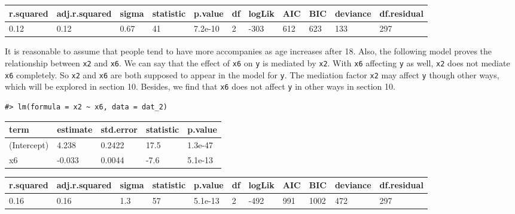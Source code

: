 \documentclass[main.tex]{subfiles}
\begin{document}
\begin{table}[H]
\centering
\begin{tabular}{lllllllllll}
\toprule
r.squared & adj.r.squared & sigma & statistic & p.value & df & logLik & AIC & BIC & deviance & df.residual\\
\midrule
0.12 & 0.12 & 0.67 & 41 & 7.2e-10 & 2 & -303 & 612 & 623 & 133 & 297\\
\bottomrule
\end{tabular}
\end{table}

It is reasonable to assume that people tend to have more accompanies as
age increases after 18. Also, the following model proves the
relationship between \texttt{x2} and \texttt{x6}. We can say that the
effect of \texttt{x6} on \texttt{y} is mediated by \texttt{x2}. With
\texttt{x6} affecting \texttt{y} as well, \texttt{x2} does not mediate
\texttt{x6} completely. So \texttt{x2} and \texttt{x6} are both supposed
to appear in the model for \texttt{y}. The mediation factor \texttt{x2}
may affect \texttt{y} though other ways, which will be explored in
section 10. Besides, we find that \texttt{x6} does not affect \texttt{y}
in other ways in section 10.

\begin{verbatim}
#> lm(formula = x2 ~ x6, data = dat_2)
\end{verbatim}

\begin{table}[H]
\centering
\begin{tabular}{lllll}
\toprule
term & estimate & std.error & statistic & p.value\\
\midrule
(Intercept) & 4.238 & 0.2422 & 17.5 & 1.3e-47\\
x6 & -0.033 & 0.0044 & -7.6 & 5.1e-13\\
\bottomrule
\end{tabular}
\end{table}

\begin{table}[H]
\centering
\begin{tabular}{lllllllllll}
\toprule
r.squared & adj.r.squared & sigma & statistic & p.value & df & logLik & AIC & BIC & deviance & df.residual\\
\midrule
0.16 & 0.16 & 1.3 & 57 & 5.1e-13 & 2 & -492 & 991 & 1002 & 472 & 297\\
\bottomrule
\end{tabular}
\end{table}
\end{document}
